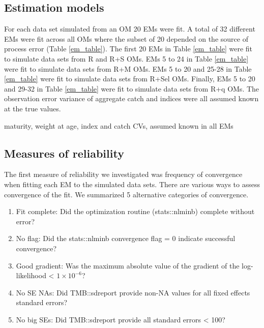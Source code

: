 \documentclass[
  12pt,
]{article}
\providecommand{\tightlist}{%
  \setlength{\itemsep}{0pt}\setlength{\parskip}{0pt}}
\begin{document}
\hypertarget{estimation-models}{%
\subsection*{Estimation models}\label{estimation-models}}

For each data set simulated from an OM 20 EMs were fit. A total of 32
different EMs were fit across all OMs where the subset of 20 depended on
the source of process error (Table \ref{em_table}). The first 20 EMs in
Table \ref{em_table} were fit to simulate data sets from R and R+S OMs.
EMs 5 to 24 in Table \ref{em_table} were fit to simulate data sets from
R+M OMs. EMs 5 to 20 and 25-28 in Table \ref{em_table} were fit to
simulate data sets from R+Sel OMs. Finally, EMs 5 to 20 and 29-32 in
Table \ref{em_table} were fit to simulate data sets from R+q OMs. The
observation error variance of aggregate catch and indices were all
assumed known at the true values.

maturity, weight at age, index and catch CVs, assumed known in all EMs

\hypertarget{measures-of-reliability}{%
\subsection*{Measures of reliability}\label{measures-of-reliability}}

The first measure of reliability we investigated was frequency of
convergence when fitting each EM to the simulated data sets. There are
various ways to assess convergence of the fit. We summarized 5
alternative categories of convergence.

\begin{enumerate}
\def\labelenumi{\arabic{enumi}.}
\tightlist
\item
  Fit complete: Did the optimization routine (stats::nlminb) complete
  without error?
\item
  No flag: Did the stats::nlminb convergence flag = 0 indicate
  successful convergence?
\item
  Good gradient: Was the maximum absolute value of the gradient of the
  log-likelihood \textless{} \(1\times10^{-6}\)?
\item
  No SE NAs: Did TMB::sdreport provide non-NA values for all fixed
  effects standard errors?
\item
  No big SEs: Did TMB::sdreport provide all standard errors \textless{}
  100?
\end{enumerate}
\end{document}
